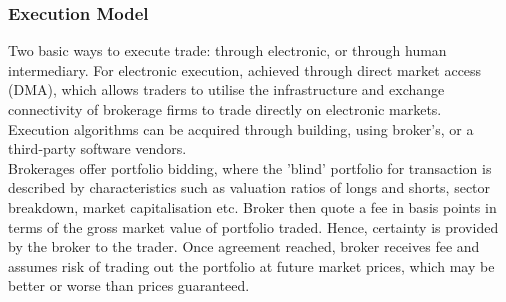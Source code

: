 \subsubsection{Execution Model}

Two basic ways to execute trade: through electronic, or through human intermediary. For electronic execution, achieved through direct market access (DMA), which allows traders to utilise the infrastructure and exchange connectivity of brokerage firms to trade directly on electronic markets.\\
Execution algorithms can be acquired through building, using broker's, or a third-party software vendors.\\
Brokerages offer portfolio bidding, where the 'blind' portfolio for transaction is described by characteristics such as valuation ratios of longs and shorts, sector breakdown, market capitalisation etc. Broker then quote a fee in basis points in terms of the gross market value of portfolio traded. Hence, certainty is provided by the broker to the trader. Once agreement reached, broker receives fee and assumes risk of trading out the portfolio at future market prices, which may be better or worse than prices guaranteed.

